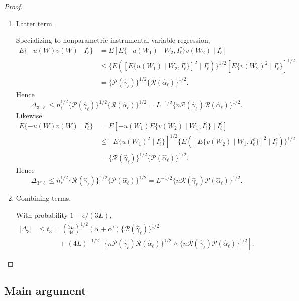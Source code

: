 \begin{proof}
\begin{enumerate}
\item Latter term.

Specializing to nonparametric instrumental variable regression,
\begin{align*}
    E\{-u(W)v(W)\mid I^c_{\ell}\}
    &=E[  E\{-u(W_1)\mid W_2, I^c_{\ell}\}v(W_2) \mid I^c_{\ell}] \\
    &\leq  \{E( [E\{u(W_1)\mid W_2, I^c_{\ell}\}]^2 \mid I^c_{\ell})\}^{1/2}[E\{v(W_2)^2\mid I^c_{\ell}\}]^{1/2} \\
    &=\{\mathcal{P}(\hat{\gamma}_{\ell})\}^{1/2}\{\mathcal{R}(\hat{\alpha}_{\ell})\}^{1/2}.
\end{align*}
Hence
$$
\Delta_{3''\ell} \leq n_{\ell}^{1/2}\{\mathcal{P}(\hat{\gamma}_{\ell})\}^{1/2}\{\mathcal{R}(\hat{\alpha}_{\ell})\}^{1/2}=L^{-1/2}\{n\mathcal{P}(\hat{\gamma}_{\ell})\mathcal{R}(\hat{\alpha}_{\ell})\}^{1/2}.
$$
Likewise
\begin{align*}
    E\{-u(W)v(W)\mid I^c_{\ell}\} 
   &=E[  -u(W_1)E\{v(W_2)\mid W_1, I^c_{\ell}\} \mid I^c_{\ell}] \\
    &\leq  [E\{u(W_1)^2\mid I^c_{\ell}\}]^{1/2}\{E( [E\{v(W_2)\mid W_1, I^c_{\ell}\}]^2 \mid I^c_{\ell})\}^{1/2} \\
    &=\{\mathcal{R}(\hat{\gamma}_{\ell})\}^{1/2}\{\mathcal{P}(\hat{\alpha}_{\ell})\}^{1/2}.
\end{align*}
Hence
$$
\Delta_{3''\ell} \leq n_{\ell}^{1/2}\{\mathcal{R}(\hat{\gamma}_{\ell})\}^{1/2}\{\mathcal{P}(\hat{\alpha}_{\ell})\}^{1/2}=L^{-1/2}\{n\mathcal{R}(\hat{\gamma}_{\ell})\mathcal{P}(\hat{\alpha}_{\ell})\}^{1/2}.
$$

    \item Combining terms.
    
 With probability $1-\epsilon/(3L)$,
\begin{align*}
    |\Delta_3| &\leq t_3= \left(\frac{3L}{4\epsilon}\right)^{1/2}(\bar{\alpha}+\bar{\alpha}')\{\mathcal{R}(\hat{\gamma}_{\ell})\}^{1/2}\\
    &\quad \quad \quad +(4L)^{-1/2} [\{n\mathcal{P}(\hat{\gamma}_{\ell})\mathcal{R}(\hat{\alpha}_{\ell})\}^{1/2} \wedge \{n\mathcal{R}(\hat{\gamma}_{\ell})\mathcal{P}(\hat{\alpha}_{\ell})\}^{1/2}].
\end{align*}
\end{enumerate}
\end{proof}

\subsection{Main argument}

